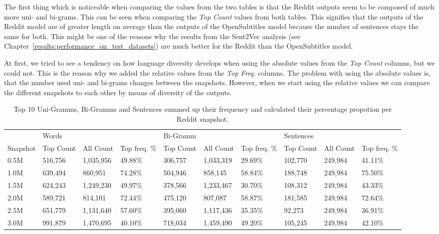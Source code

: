 The first thing which is noticeable when comparing the values from the two tables is that the Reddit outputs seem to be composed of much more uni- and bi-grams. This can be seen when comparing the \emph{Top Count} values from both tables. This signifies that the outputs of the Reddit model are of greater length on average than the outputs of the OpenSubtitles model because the number of sentences stays the same for both. This might be one of the reasons why the results from the Sent2Vec analysis (see Chapter~\ref{results:performance_on_test_datasets}) are much better for the Reddit than the OpenSubtitles model.

At first, we tried to see a tendency on how language diversity develops when using the absolute values from the \emph{Top Count} columns, but we could not. This is the reason why we added the relative values from the \emph{Top Freq.} columns. The problem with using the absolute values is, that the number used uni- and bi-grams changes between the snapshots. However, when we start using the relative values we can compare the different snapshots to each other by means of diversity of the outputs. 

\begin{table}[H]
	\centering
	\begin{adjustbox}{max width=\textwidth}
		\begin{tabular}{llllllllll}
			\toprule
			& Words &&&Bi-Gramm&&&Sentences&&\\
			Snapshot & Top Count & All Count& Top freq. \%&  Top Count& All Count& Top freq. \%&  Top Count& All Count& Top freq. \%\\
			\midrule
			0.5M & 516,756	 & 1,035,956	& 49.88\%	&306,757	&1,033,319	&29.69\%	&102,770	&249,984	&41.11\%\\
			1.0M & 639,494	 & 860,951		& 74.28\%	&504,946	&858,145	&58.84\%	&188,748	&249,984	&75.50\%\\
			1.5M & 624,243	 & 1,249,230	& 49.97\%	&378,566	&1,233,467	&30.70\%	&108,312	&249,984	&43.33\%\\
			2.0M & 589,721	 & 814,101		& 72.44\%	&475,120	&807,087	&58.87\%	&181,585	&249,984	&72.64\%\\
			2.5M & 651,779	 & 1,131,640	& 57.60\%	&395,060	&1,117,436	&35.35\%	&92,273		&249,984	&36.91\%\\
			3.0M & 991,879	 & 1,470,695	& 40.10\%	&718,034	&1,459,490	&49.20\%	&105,245	&249,984	&42.10\%\\
			\bottomrule
		\end{tabular}
	\end{adjustbox}
	\caption{Top 10 Uni-Gramms, Bi-Gramms and Sentences summed up their frequency and calculated their percentage propotion per Reddit snapshot.}
	\label{results:top_10_frequency:OpenSubtitles}
\end{table}


